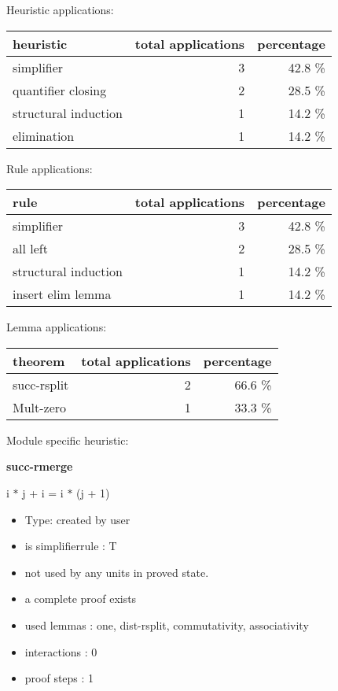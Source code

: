 \documentclass[a4paper]{article}
\begin{document}
\medskip


Heuristic applications:

\begin{supertabular}{l|r|r}
heuristic	& total applications & percentage \\ \hline
simplifier & 3 & 42.8 \% \\
quantifier closing & 2 & 28.5 \% \\
structural induction & 1 & 14.2 \% \\
elimination & 1 & 14.2 \% \\

\end{supertabular}

Rule applications:

\begin{supertabular}{l|r|r}
rule	        & total applications & percentage \\ \hline
simplifier & 3 & 42.8 \% \\
all left & 2 & 28.5 \% \\
structural induction & 1 & 14.2 \% \\
insert elim lemma & 1 & 14.2 \% \\

\end{supertabular}

Lemma applications:

\begin{supertabular}{l|r|r}
theorem	        & total applications & percentage \\ \hline
succ-rsplit & 2 & 66.6 \% \\
Mult-zero & 1 & 33.3 \% \\

\end{supertabular}

Module specific heuristic:

\pagebreak

{\LARGE\bf succ-rmerge}\label{lemma-succ-rmerge}

\medskip

 \Fol i $*$ j + i = i $*$ (j + 1)

\begin{itemize}

\item Type: created by user

\item is simplifierrule : T
\item not used by any units in proved state.
\item       a complete proof exists
\item       used lemmas  : one, dist-rsplit, commutativity, associativity
\item       interactions : 0
\item       proof steps  : 1
\end{itemize}
\end{document}
